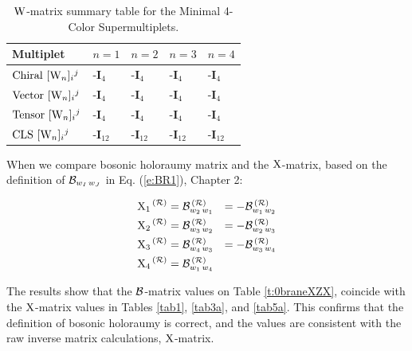 \documentclass[12pt]{article}
\let\bm\relax
\newcommand{\bm}[1]{{\boldsymbol{#1}}}
\begin{document}
\begin{table}[!ht]
\begin{center}
\begin{tabular}{|m{6.2em}|m{2.2cm}|m{2.2cm}|m{2.2cm}|m{2.2cm}|}
\hline
Multiplet $~~~~~$ &  $n=1$& $n=2$& $n=3$& $n=4$\\ 
\hline
${\rm {Chiral}} ~[{\bm{\rm W}}_n]_{i}{}^{j}$&  
-$\mathbf{I}_4$&  
-$\mathbf{I}_4$&  
-$\mathbf{I}_4$&
-$\mathbf{I}_4$\\ 
\hline
${\rm {Vector}} ~[{\bm{\rm W}}_n]_{i}{}^{j}$&  
-$\mathbf{I}_4$&  
-$\mathbf{I}_4$&  
-$\mathbf{I}_4$&
-$\mathbf{I}_4$\\ 
\hline
${\rm {Tensor}} ~[{\bm{\rm W}}_n]_{i}{}^{j}$ &  
-$\mathbf{I}_4$&  
-$\mathbf{I}_4$&  
-$\mathbf{I}_4$&
-$\mathbf{I}_4$\\ 
\hline
${\rm {CLS}} ~[{\bm{\rm W}}_n]_{i}{}^{j}$ &  
-$\mathbf{I}_{12}$&  
-$\mathbf{I}_{12}$&  
-$\mathbf{I}_{12}$&
-$\mathbf{I}_{12}$\\ 
\hline
\end{tabular}
\end{center}
\caption{$\bm{\rm W}$-matrix summary table for the Minimal 4-Color Supermultiplets.}
\label{tabZ}
\end{table}

When we compare bosonic holoraumy matrix and the $\bm{\rm X}$-matrix, based on the definition of ${\bm{\cal B}}_{w_I\,w_J}$ in Eq. (\ref{e:BR1}), Chapter 2:

\begin{eqnarray}
\bm{\rm{X_1}}^{\, ({\cal R})}&={\bm{\cal B}}_{{w_2}\,{w_1}}^{\, ({\cal R})}&=-{\bm{\cal B}}_{{w_1}\,{w_2}}^{\, ({\cal R})}
\nonumber\\
\bm{\rm{X_2}}^{\,({\cal R})}&= 
{\bm{\cal B}}_{{w_3}\,{w_2}}^{\,({\cal R})}&=-{\bm{\cal B}}_{{w_2}\,{w_3}}^{\, ({\cal R})} \nonumber\\
\bm{\rm{X_3}}^{\, ({\cal R})}&= {\bm{\cal B}}_{{w_4}\,{w_3}}^{\,({\cal R})}
&=-{\bm{\cal B}}_{{w_3}\,{w_4}}^{\,({\cal R})}
\nonumber\\
\bm{\rm{X_4}}^{\, ({\cal R})}&=
{\bm{\cal B}}_{{w_1}\,{w_4}}^{\, ({\cal R})}&
\label{eq41}
\end{eqnarray}

The results show that the ${\bm{\cal B}}$-matrix values on Table \ref{t:0braneXZX}, coincide with the $\bm{\rm X}$-matrix values in Tables \ref{tab1}, \ref{tab3a}, and \ref{tab5a}. This confirms that the definition of bosonic holoraumy is correct, and the values are consistent with the raw inverse matrix calculations, $\bm{\rm X}$-matrix.
\end{document}
